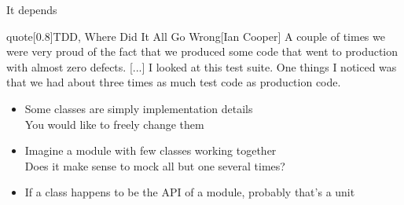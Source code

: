 \begin{frame}{It depends}
    \vspace{-3mm}
    \begin{varblock}{quote}[0.8\textwidth]{TDD, Where Did It All Go Wrong}[Ian Cooper]
        A couple of times we were very proud of the fact that we produced some code that went to production with almost zero defects.
        [...]
        I looked at this test suite.
        One things I noticed was that \alert{we had about three times as much test code as production code}.
    \end{varblock}
    \begin{itemize}
        \item Some classes are simply implementation details\\
        \then You would like to freely change them
        \item Imagine a module with few classes working together \\
        \then Does it make sense to mock all but one several times?
        \item If a class happens to be the API of a module, probably that's a unit
    \end{itemize}
\end{frame}


